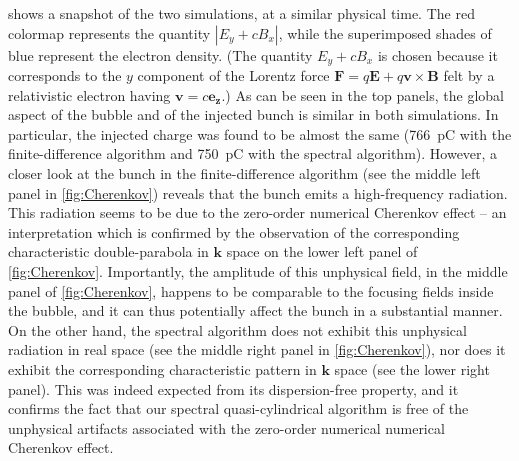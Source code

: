 \documentclass[1p,times]{elsarticle}
\renewcommand{\vec}[1]{\boldsymbol{#1}}
\begin{document}
 shows a snapshot of the two
simulations, at a similar physical time. The red colormap represents the quantity
$|E_y+cB_x|$, while the superimposed shades of blue represent the
electron density. (The quantity $E_y+cB_x$ is chosen because it corresponds to the $y$ component of
the Lorentz force $\vec{F} = q\vec{E} + q\vec{v}\times\vec{B}$ felt by
a relativistic electron having $\vec{v} = c\vec{e_z}$.) As can be seen
in the top panels, the global aspect of the bubble and of the injected
bunch is similar in both simulations. In particular, the injected
charge was found to be almost the same (766~pC with the
finite-difference algorithm and 750~pC with the spectral
algorithm). However, a closer look at the bunch in the
finite-difference algorithm (see the middle left panel in
\cref{fig:Cherenkov}) reveals that the bunch emits a
high-frequency radiation. This radiation seems to be due to the
zero-order numerical Cherenkov effect -- an interpretation which is confirmed by
the observation of the corresponding characteristic double-parabola in
$\vec{k}$ space \cite{LehePRSTAB2013,GodfreyJCP2013,XuCPC2013} on the lower left
panel of \cref{fig:Cherenkov}. Importantly, the amplitude of this
unphysical field, in the middle panel of \cref{fig:Cherenkov}, 
happens to be comparable to the focusing
fields inside the bubble, and it can thus potentially affect the bunch
in a substantial manner. On the other hand, the spectral algorithm does not
exhibit this unphysical radiation in real space (see the middle right panel in
\cref{fig:Cherenkov}), nor does it exhibit the corresponding
characteristic pattern in $\vec{k}$ space (see the lower right
panel). This was indeed expected from its dispersion-free property, 
and it confirms the fact that our spectral quasi-cylindrical algorithm is free of
the unphysical artifacts associated with the zero-order numerical
numerical Cherenkov effect.
\end{document}

